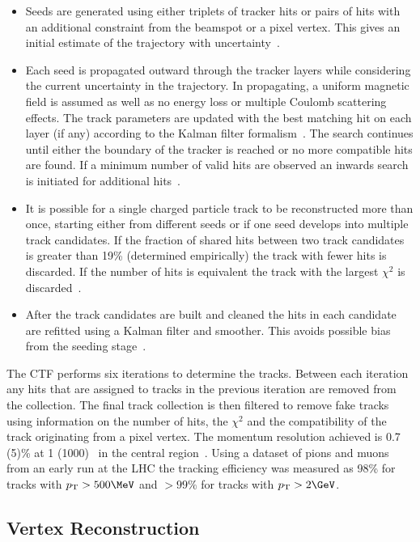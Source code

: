 \begin{itemize}
\item Seeds are generated using either triplets of tracker hits or pairs of hits with an additional constraint 
from the beamspot or a pixel vertex. This gives an initial estimate of the trajectory with uncertainty~\cite{tracker_early}.
\item Each seed is propagated outward through the tracker layers while considering the current uncertainty in the trajectory.
In propagating, a uniform magnetic field is assumed as well as no energy loss or multiple Coulomb scattering effects.
The track parameters are updated with the best matching hit on each layer (if any) according to the Kalman filter formalism~\cite{tracker_vertex}.
The search continues until either the boundary of the tracker is reached or no more compatible hits are found. If a minimum number
of valid hits are observed an inwards search is initiated for additional hits~\cite{tracker_early}.
\item It is possible for a single charged particle track to be reconstructed more than once, starting either from different seeds or if
one seed develops into multiple track candidates. If the fraction of shared hits between two track candidates is greater
than 19\% (determined empirically) the track with fewer hits is discarded. If the number of hits is equivalent the track with
 the largest $\chi^2$ is discarded~\cite{tracker_vertex}.
\item After the track candidates are built and cleaned the hits in each candidate are refitted using a Kalman filter and smoother. This 
avoids possible bias from the seeding stage~\cite{tracker_vertex}.
\end{itemize}

The CTF performs six iterations to determine the tracks. Between each iteration any hits that are assigned to tracks in the
previous iteration are removed from the collection. The final track collection is then filtered to remove fake tracks using 
information on the number of hits, the $\chi^2$ and the compatibility of the track originating from a pixel vertex. The momentum 
resolution achieved is 0.7 (5)\% at 1 (1000) \GeV~in the central region~\cite{tracker_early}. Using a dataset of pions and muons from an early run 
at the LHC the tracking efficiency was measured as 98\% for tracks with $\pt > 500\MeV$ and $>99\%$ for tracks with $\pt > 2\GeV$\cite{tracker_eff}.

\subsection{Vertex Reconstruction}

